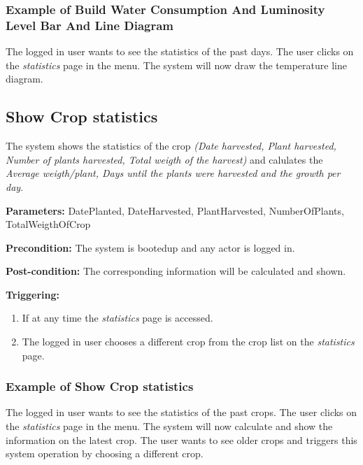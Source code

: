 \subsubsection{Example of Build Water Consumption And Luminosity Level Bar And
Line Diagram}
The logged in user wants to see the statistics of the past days.
The user clicks on the \emph{statistics} page in the menu.
The system will now draw the temperature line diagram.




\subsection{Show Crop statistics}
\label{operation:ShowCropStatistics}
The system shows the statistics of the crop \emph{(Date harvested, Plant
harvested, Number of plants harvested, Total weigth of the harvest)} and
calulates the \emph{Average weigth/plant, Days until the plants were harvested
and the growth per day}.

\begin{description}

\item \textbf{Parameters:} DatePlanted, DateHarvested, PlantHarvested,
NumberOfPlants, TotalWeigthOfCrop
\item \textbf{Precondition:} The system is bootedup and any actor is logged in.
\item \textbf{Post-condition:} The corresponding information will be calculated
and shown.

\item \textbf{Triggering:}
\begin{enumerate}
\item If at any time the \emph{statistics} page is accessed.
\item The logged in user chooses a different crop from the crop list on the
\emph{statistics} page.
\end{enumerate}
\end{description}


\subsubsection{Example of Show Crop statistics}
The logged in user wants to see the statistics of the past crops.
The user clicks on the \emph{statistics} page in the menu.
The system will now calculate and show the information on the latest crop.
The user wants to see older crops and triggers this system operation by choosing
a different crop.


